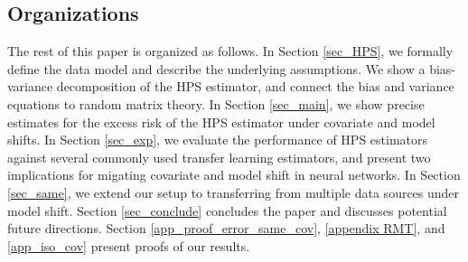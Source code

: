 


\subsection{Organizations}
The rest of this paper is organized as follows.
In Section \ref{sec_HPS}, we formally define the data model and describe the underlying assumptions.
We show a bias-variance decomposition of the HPS estimator, and connect the bias and variance equations to random matrix theory.
In Section \ref{sec_main}, we show precise estimates for the excess risk of the HPS estimator under covariate and model shifts.
In Section \ref{sec_exp}, we evaluate the performance of HPS estimators against several commonly used transfer learning estimators, and present two implications for migating covariate and model shift in neural networks.
In Section \ref{sec_same}, we extend our setup to transferring from multiple data sources under model shift.
Section \ref{sec_conclude} concludes the paper and discusses potential future directions.
Section \ref{app_proof_error_same_cov}, \ref{appendix RMT}, and \ref{app_iso_cov} present proofs of our results.